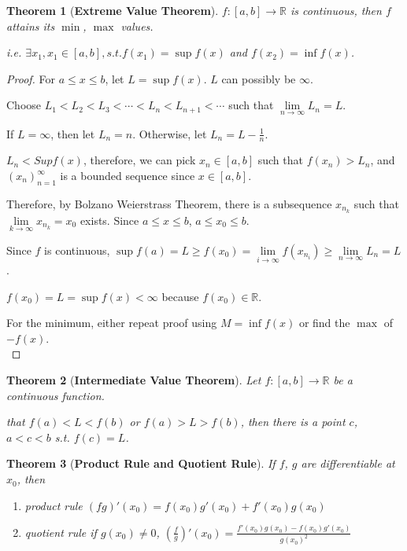 \documentclass[12pt]{article}
\theoremstyle{plain}
\newtheorem{theorem}{Theorem}[section]
\newcommand{\dlim}{\displaystyle\lim\limits}
\begin{document}
	\begin{theorem}[\textbf{Extreme Value Theorem}]
		$f:[a,b]\to \mathbb{R}$ is continuous, 
		then $f$ attains its $\min$, $\max$ values.

		i.e. $\exists x_1, x_1\in [a,b], s.t. f(x_1)=\sup f(x)$ 
		and $f(x_2) = \inf f(x)$.
	\end{theorem}    
	\begin{proof}
		For $a\leq x\leq b$, let $L = \sup f(x)$. $L$ can possibly be $\infty$.

		Choose $L_1<L_2<L_3<\cdots<L_n<L_{n+1}<\cdots$ such that
		$\dlim_{n\to\infty} L_n=L$. 

		If $L=\infty$, then let $L_n = n$. Otherwise, let $L_n=L-\frac1n$. 

		$L_n<Sup f(x)$, therefore, we can pick $x_n\in[a,b]$ such that
		$f(x_n)>L_n$, and $(x_n)_{n=1}^{\infty}$ is a bounded sequence since 
		$x\in[a,b]$. 

		Therefore, by Bolzano Weierstrass Theorem, there is a subsequence $x_{n_k}$
		such that $\dlim_{k\to\infty}x_{n_k}=x_0$ exists. Since $a\leq x\leq b$,
		$a\leq x_0\leq b$. 
  
 		Since $f$ is continuous,
 		$\sup f(a)= L\geq f(x_0)=\dlim_{i\to\infty} f(x_{n_i})\geq
 		\dlim_{n\to\infty}L_n=L$.

		$f(x_0) = L = \sup f(x)<\infty$ because $f(x_0)\in\mathbb{R}$.

		For the minimum, either repeat proof using $M=\inf f(x)$ 
		or find the $\max$ of $-f(x)$.\\
	\end{proof}
    
	\begin{theorem}[\textbf{Intermediate Value Theorem}]
		Let $f: [a,b] \to \mathbb{R}$ be a continuous function.

		that $f(a)<L<f(b)$ or $f(a)>L>f(b)$, then there is a point $c$, 
			$a<c<b$ s.t. $f(c) = L$.\\
		\end{theorem}

		\begin{theorem}[\textbf{Product Rule and Quotient Rule}]
			If $f$, $g$ are differentiable at $x_0$, then 
			\begin{enumerate}
				\item product rule  $(fg)'(x_0) = f(x_0)g'(x_0)+f'(x_0)g(x_0)$
				\item quotient rule if $g(x_0) \neq 0$, 
					$(\frac fg)'(x_0) = \frac{f'(x_0) g(x_0) -f(x_0) g'(x_0)}{g(x_0)^2}$\\
			\end{enumerate}
		\end{theorem}
\end{document}

